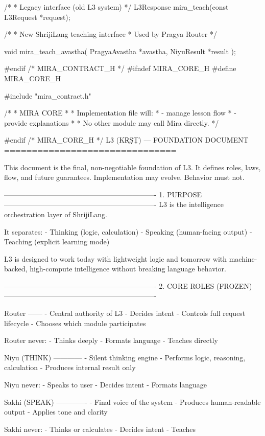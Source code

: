 \documentclass{article}
\begin{document}
/*
 * Legacy interface (old L3 system)
 */
L3Response mira_teach(const L3Request *request);

/*
 * New ShrijiLang teaching interface
 * Used by Pragya Router
 */

void mira_teach_avastha(
    PragyaAvastha *avastha,
    NiyuResult *result
);

#endif /* MIRA_CONTRACT_H */
#ifndef MIRA_CORE_H
#define MIRA_CORE_H

#include "mira_contract.h"

/*
 * MIRA CORE
 *
 * Implementation file will:
 * - manage lesson flow
 * - provide explanations
 *
 * No other module may call Mira directly.
 */

#endif /* MIRA_CORE_H */
L3 (KR̥ṢṬ) — FOUNDATION DOCUMENT
===============================

This document is the final, non-negotiable foundation of L3.
It defines roles, laws, flow, and future guarantees.
Implementation may evolve. Behavior must not.

----------------------------------------------------------------
1. PURPOSE
----------------------------------------------------------------
L3 is the intelligence orchestration layer of ShrijiLang.

It separates:
- Thinking (logic, calculation)
- Speaking (human-facing output)
- Teaching (explicit learning mode)

L3 is designed to work today with lightweight logic
and tomorrow with machine-backed, high-compute intelligence
without breaking language behavior.

----------------------------------------------------------------
2. CORE ROLES (FROZEN)
----------------------------------------------------------------

Router
------
- Central authority of L3
- Decides intent
- Controls full request lifecycle
- Chooses which module participates

Router never:
- Thinks deeply
- Formats language
- Teaches directly

Niyu (THINK)
------------
- Silent thinking engine
- Performs logic, reasoning, calculation
- Produces internal result only

Niyu never:
- Speaks to user
- Decides intent
- Formats language

Sakhi (SPEAK)
-------------
- Final voice of the system
- Produces human-readable output
- Applies tone and clarity

Sakhi never:
- Thinks or calculates
- Decides intent
- Teaches
\end{document}
